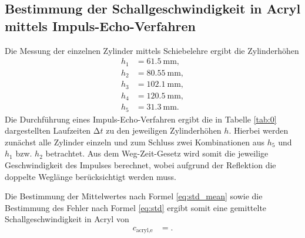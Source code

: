 \subsection{Bestimmung der Schallgeschwindigkeit in Acryl mittels Impuls-Echo-Verfahren}
Die Messung der einzelnen Zylinder mittels Schiebelehre ergibt die Zylinderhöhen
\begin{align*}
  h_1 &= \SI{61.5}{\milli\metre}, \\
  h_2 &= \SI{80.55}{\milli\metre}, \\
  h_3 &= \SI{102.1}{\milli\metre}, \\
  h_4 &= \SI{120.5}{\milli\metre}, \\
  h_5 &= \SI{31.3}{\milli\metre}.
\end{align*}
Die Durchführung eines Impuls-Echo-Verfahren ergibt die in Tabelle \ref{tab:0} dargestellten Laufzeiten $\increment t$ zu den jeweiligen Zylinderhöhen $h$.
Hierbei werden zunächst alle Zylinder einzeln und zum Schluss zwei Kombinationen aus $h_5$ und $h_1$ bzw. $h_2$ betrachtet.
Aus dem Weg-Zeit-Gesetz wird somit die jeweilige Geschwindigkeit des Impulses berechnet, wobei aufgrund der Reflektion die doppelte Weglänge berücksichtigt werden muss.
  
Die Bestimmung der Mittelwertes nach Formel \eqref{eq:std_mean} sowie die Bestimmung des Fehler nach Formel \eqref{eq:std} ergibt somit eine gemittelte Schallgeschwindigkeit in Acryl von
\begin{align*}
  c_{\text{acryl,e}} &= .\\
\end{align*}

